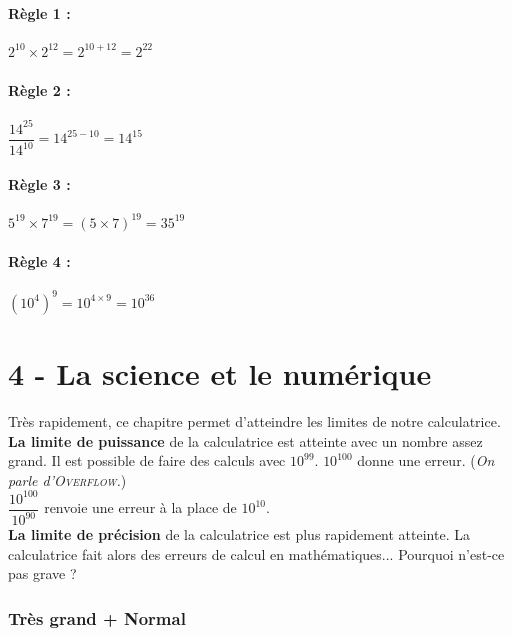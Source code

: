 \documentclass[12pt]{article}
\begin{document}
\setlength{\columnseprule}{0pt}

\begin{multicols}{2}

  \paragraph{Règle 1 : } $ 2^{10} \times 2^{12} = 2^{10 + 12} = 2^{22} $

  \paragraph{Règle 2 : } $ \dfrac{14^{25}}{14^{10}} = 14^{25 - 10} = 14^{15} $

  \paragraph{Règle 3 : } $ 5^{19} \times 7^{19} = (5 \times 7)^{19} = 35^{19} $

  \paragraph{Règle 4 : } $ (10^4)^9 = 10^{4 \times 9} = 10^36 $


\end{multicols}

\section*{4 - La science et le numérique}

Très rapidement, ce chapitre permet d'atteindre les limites de notre calculatrice. \\

\textbf{La limite de puissance} de la calculatrice est atteinte avec un nombre assez grand. Il est possible de faire des calculs avec $10^{99}$. $10^{100}$ donne une erreur. (\textit{On parle d'\textsc{Overflow}.}) \\

$\dfrac{10^{100}}{10^{90}}$ renvoie une erreur à la place de $10^{10}$.\\ 

\textbf{La limite de précision} de la calculatrice est plus rapidement atteinte. La calculatrice fait alors des erreurs de calcul en mathématiques... Pourquoi n'est-ce pas grave ?

\subsubsection*{Très grand + Normal}
\end{document}
